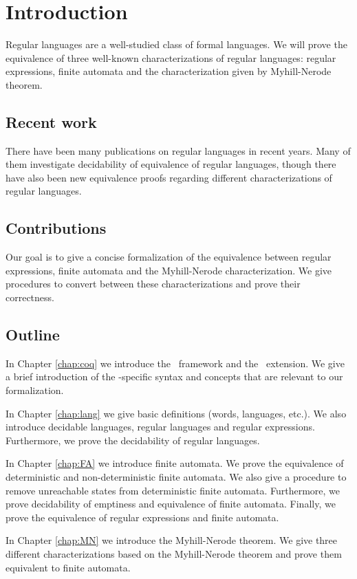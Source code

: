 \chapter{Introduction}

Regular languages are a well-studied class of formal languages. 
We will prove the equivalence of three well-known characterizations of regular languages: regular expressions, finite automata and the characterization given by Myhill-Nerode theorem.

\section{Recent work}

There have been many publications on regular languages in recent years. Many of them investigate decidability of equivalence of regular languages, though there have also been new equivalence proofs regarding different characterizations of regular languages.

\section{Contributions}
Our goal is to give a concise formalization of the equivalence between regular expressions, finite automata and the Myhill-Nerode characterization. 
We give procedures to convert between these characterizations and prove their correctness.

\section{Outline}
In Chapter \ref{chap:coq} we introduce the \coq\ framework and the \ssreflect\ extension. 
We give a brief introduction of the \ssreflect-specific syntax and concepts that are relevant to our formalization.

In Chapter \ref{chap:lang} we give basic definitions (words, languages, etc.). 
We also introduce decidable languages, regular languages and regular expressions. 
Furthermore, we prove the decidability of regular languages.

In Chapter \ref{chap:FA} we introduce finite automata. 
We prove the equivalence of deterministic and non-deterministic finite automata.
We also give a procedure to remove unreachable states from deterministic finite automata.
Furthermore, we prove decidability of emptiness and equivalence of finite automata.
Finally, we prove the equivalence of regular expressions and finite automata.

In Chapter \ref{chap:MN} we introduce the Myhill-Nerode theorem.
We give three different characterizations based on the Myhill-Nerode theorem and prove them equivalent to finite automata.
